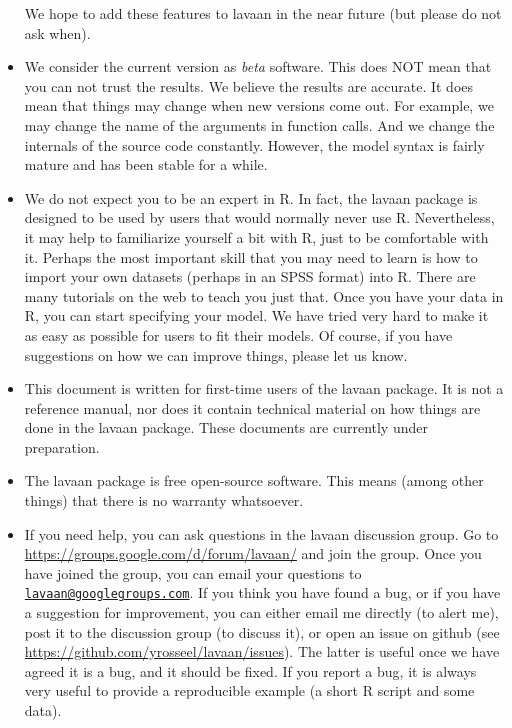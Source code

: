 \begin{itemize}
  We hope to add these features to lavaan in the near future (but please
  do not ask when).
\item
  We consider the current version as \emph{beta} software. This does NOT
  mean that you can not trust the results. We believe the results are
  accurate. It does mean that things may change when new versions come
  out. For example, we may change the name of the arguments in function
  calls. And we change the internals of the source code constantly.
  However, the model syntax is fairly mature and has been stable for a
  while.
\item
  We do not expect you to be an expert in R. In fact, the lavaan package
  is designed to be used by users that would normally never use R.
  Nevertheless, it may help to familiarize yourself a bit with R, just
  to be comfortable with it. Perhaps the most important skill that you
  may need to learn is how to import your own datasets (perhaps in an
  SPSS format) into R. There are many tutorials on the web to teach you
  just that. Once you have your data in R, you can start specifying your
  model. We have tried very hard to make it as easy as possible for
  users to fit their models. Of course, if you have suggestions on how
  we can improve things, please let us know.
\item
  This document is written for first-time users of the lavaan package.
  It is not a reference manual, nor does it contain technical material
  on how things are done in the lavaan package. These documents are
  currently under preparation.
\item
  The lavaan package is free open-source software. This means (among
  other things) that there is no warranty whatsoever.
\item
  If you need help, you can ask questions in the lavaan discussion
  group. Go to \url{https://groups.google.com/d/forum/lavaan/} and join
  the group. Once you have joined the group, you can email your
  questions to
  \href{mailto:lavaan@googlegroups.com}{\nolinkurl{lavaan@googlegroups.com}}.
  If you think you have found a bug, or if you have a suggestion for
  improvement, you can either email me directly (to alert me), post it
  to the discussion group (to discuss it), or open an issue on github
  (see \url{https://github.com/yrosseel/lavaan/issues}). The latter is
  useful once we have agreed it is a bug, and it should be fixed. If you
  report a bug, it is always very useful to provide a reproducible
  example (a short R script and some data).
\end{itemize}
